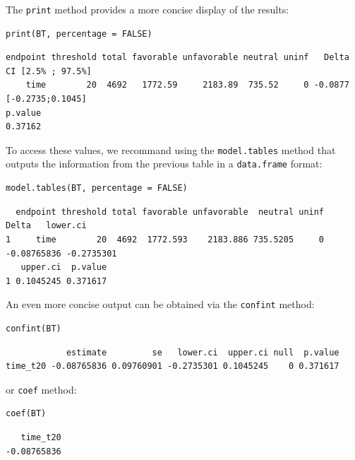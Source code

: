 \documentclass[12pt]{article}
\begin{document}
\clearpage

The \texttt{print} method provides a more concise display of the results:
\lstset{language=r,label= ,caption= ,captionpos=b,numbers=none}
\begin{lstlisting}
print(BT, percentage = FALSE)
\end{lstlisting}

\begin{verbatim}
endpoint threshold total favorable unfavorable neutral uninf   Delta CI [2.5% ; 97.5%]
    time        20  4692   1772.59     2183.89  735.52     0 -0.0877  [-0.2735;0.1045]
p.value
0.37162
\end{verbatim}


\bigskip

To access these values, we recommand using the \texttt{model.tables} method
that outputs the information from the previous table in a \texttt{data.frame}
format:

\lstset{language=r,label= ,caption= ,captionpos=b,numbers=none}
\begin{lstlisting}
model.tables(BT, percentage = FALSE)
\end{lstlisting}

\begin{verbatim}
  endpoint threshold total favorable unfavorable  neutral uninf       Delta   lower.ci
1     time        20  4692  1772.593    2183.886 735.5205     0 -0.08765836 -0.2735301
   upper.ci  p.value
1 0.1045245 0.371617
\end{verbatim}


\bigskip

An even more concise output can be obtained via the \texttt{confint} method:
\lstset{language=r,label= ,caption= ,captionpos=b,numbers=none}
\begin{lstlisting}
confint(BT)
\end{lstlisting}

\begin{verbatim}
            estimate         se   lower.ci  upper.ci null  p.value
time_t20 -0.08765836 0.09760901 -0.2735301 0.1045245    0 0.371617
\end{verbatim}


or \texttt{coef} method:
\lstset{language=r,label= ,caption= ,captionpos=b,numbers=none}
\begin{lstlisting}
coef(BT)
\end{lstlisting}

\begin{verbatim}
   time_t20 
-0.08765836
\end{verbatim}
\end{document}
